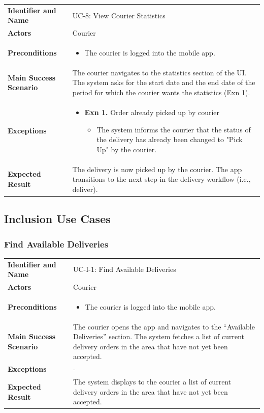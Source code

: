 \noindent
\begin{tabularx}{\textwidth}{l X}
    \textbf{Identifier and Name} & UC-8: View Courier Statistics \\
    \textbf{Actors} & Courier \\
    \textbf{Preconditions} & 
    \begin{itemize} 
        \item The courier is logged into the mobile app.
    \end{itemize} \\
    \textbf{Main Success Scenario} & The courier navigates to the statistics section of the UI. The system asks for the start date and the end date of the period for which the courier wants the statistics (Exn 1). \\
    \textbf{Exceptions} & 
    \begin{itemize} 
        \item \textbf{Exn 1.} Order already picked up by courier
        \begin{itemize}
            \item The system informs the courier that the status of the delivery has already been changed to "Pick Up" by the courier.
        \end{itemize}
    \end{itemize} \\
    \textbf{Expected Result} & The delivery is now picked up by the courier. The app transitions to the next step in the delivery workflow (i.e., deliver).
\end{tabularx}


\subsection{Inclusion Use Cases}

\subsubsection{Find Available Deliveries}

\noindent
\begin{tabularx}{\textwidth}{l X}
    \textbf{Identifier and Name} & UC-I-1: Find Available Deliveries \\
    \textbf{Actors} & Courier \\
    \textbf{Preconditions} & 
    \begin{itemize} 
        \item The courier is logged into the mobile app.
    \end{itemize} \\
    \textbf{Main Success Scenario} & The courier opens the app and navigates to the “Available Deliveries” section. The system fetches a list of current delivery orders in the area that have not yet been accepted. \\
    \textbf{Exceptions} & 
     - \\
    \textbf{Expected Result} & The system displays to the courier a list of current delivery orders in the area that have not yet been accepted.
\end{tabularx}